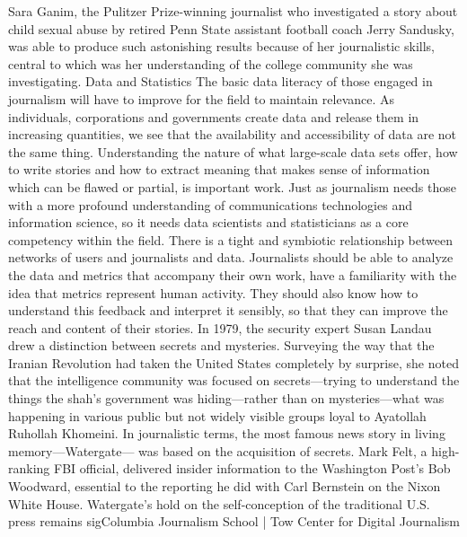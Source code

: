 Sara Ganim, the Pulitzer Prize-winning journalist who investigated a story
about child sexual abuse by retired Penn State assistant football coach Jerry Sandusky,
was able to produce such astonishing results because of her journalistic
skills, central to which was her understanding of the college community she
was investigating.
Data and Statistics
The basic data literacy of those engaged in journalism will have to improve for
the field to maintain relevance. As individuals, corporations and governments
create data and release them in increasing quantities, we see that the availability
and accessibility of data are not the same thing. Understanding the nature of what
large-scale data sets offer, how to write stories and how to extract meaning that
makes sense of information which can be flawed or partial, is important work.
Just as journalism needs those with a more profound understanding of communications
technologies and information science, so it needs data scientists and
statisticians as a core competency within the field.
There is a tight and symbiotic relationship between networks of users and
journalists and data. Journalists should be able to analyze the data and metrics
that accompany their own work, have a familiarity with the idea that metrics
represent human activity. They should also know how to understand this feedback
and interpret it sensibly, so that they can improve the reach and content
of their stories.
In 1979, the security expert Susan Landau drew a distinction between secrets
and mysteries. Surveying the way that the Iranian Revolution had taken the
United States completely by surprise, she noted that the intelligence community
was focused on secrets—trying to understand the things the shah’s government
was hiding—rather than on mysteries—what was happening in various
public but not widely visible groups loyal to Ayatollah Ruhollah Khomeini.
In journalistic terms, the most famous news story in living memory—Watergate—
was based on the acquisition of secrets. Mark Felt, a high-ranking FBI
official, delivered insider information to the Washington Post’s Bob Woodward,
essential to the reporting he did with Carl Bernstein on the Nixon White House.
Watergate’s hold on the self-conception of the traditional U.S. press remains sigColumbia
Journalism School | Tow Center for Digital Journalism

